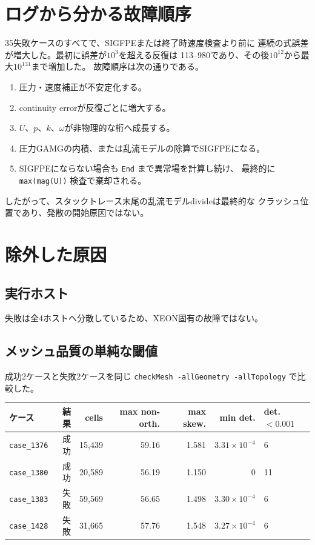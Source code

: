 \documentclass[a4paper,11pt]{article}
\begin{document}
\section{ログから分かる故障順序}

35失敗ケースのすべてで、SIGFPEまたは終了時速度検査より前に
連続の式誤差が増大した。最初に誤差が$10^3$を超える反復は
113--980であり、その後$10^{12}$から最大$10^{131}$まで増加した。
故障順序は次の通りである。

\begin{enumerate}[leftmargin=24pt]
  \item 圧力・速度補正が不安定化する。
  \item continuity errorが反復ごとに増大する。
  \item $U$、$p$、$k$、$\omega$が非物理的な桁へ成長する。
  \item 圧力GAMGの内積、または乱流モデルの除算でSIGFPEになる。
  \item SIGFPEにならない場合も \texttt{End} まで異常場を計算し続け、
    最終的に \texttt{max(mag(U))} 検査で棄却される。
\end{enumerate}

したがって、スタックトレース末尾の乱流モデルdivideは最終的な
クラッシュ位置であり、発散の開始原因ではない。

\section{除外した原因}

\subsection{実行ホスト}

失敗は全4ホストへ分散しているため、XEON固有の故障ではない。

\subsection{メッシュ品質の単純な閾値}

成功2ケースと失敗2ケースを同じ
\texttt{checkMesh -allGeometry -allTopology} で比較した。

\begin{center}
\small
\begin{tabular}{lrrrrrl}
\toprule
ケース & 結果 & cells & max non-orth. & max skew. &
min det. & det.$<0.001$ \\
\midrule
\texttt{case\_1376} & 成功 & 15,439 & 59.16 & 1.581 &
$3.31{\times}10^{-4}$ & 6 \\
\texttt{case\_1380} & 成功 & 20,589 & 56.19 & 1.150 &
0 & 11 \\
\texttt{case\_1383} & 失敗 & 59,569 & 56.65 & 1.498 &
$3.30{\times}10^{-4}$ & 6 \\
\texttt{case\_1428} & 失敗 & 31,665 & 57.76 & 1.548 &
$3.27{\times}10^{-4}$ & 6 \\
\bottomrule
\end{tabular}
\end{center}
\end{document}
